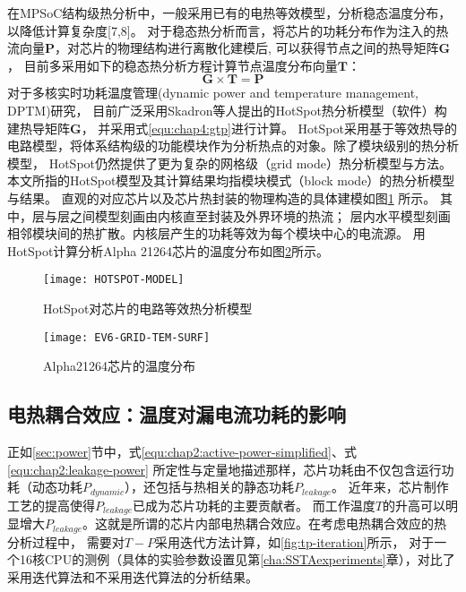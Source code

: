 在MPSoC结构级热分析中，一般采用已有的电热等效模型，分析稳态温度分布，以降低计算复杂度[7,8]。 对于稳态热分析而言，将芯片的功耗分布作为注入的热流向量$\mathbf{P}$，对芯片的物理结构进行离散化建模后, 可以获得节点之间的热导矩阵$\mathbf{G}$， 目前多采用如下的稳态热分析方程计算节点温度分布向量$\mathbf{T}$：
\begin{equation}
\label{equ:chap4:gtp}
\mathbf{G} \times \mathbf{T} = \mathbf{P}
\end{equation}
对于多核实时功耗温度管理(dynamic power and temperature management, DPTM)研究， 目前广泛采用Skadron等人提出的HotSpot热分析模型（软件）构建热导矩阵$\mathbf{G}$， 并采用式\ref{equ:chap4:gtp}进行计算。 HotSpot采用基于等效热导的电路模型，将体系结构级的功能模块作为分析热点的对象。除了模块级别的热分析模型， HotSpot仍然提供了更为复杂的网格级（grid mode）热分析模型与方法。本文所指的HotSpot模型及其计算结果均指模块模式（block mode）的热分析模型与结果。 直观的对应芯片以及芯片热封装的物理构造的具体建模如图\ref{fig:hotspot-model} 所示。
其中，层与层之间模型刻画由内核直至封装及外界环境的热流； 层内水平模型刻画相邻模块间的热扩散。内核层产生的功耗等效为每个模块中心的电流源。 用HotSpot计算分析Alpha 21264芯片的温度分布如图\ref{fig:ev6-grid-temp-surf}所示。

\begin{figure}[H]
  \centering
  \texttt{[image: HOTSPOT-MODEL]}
  \caption{HotSpot对芯片的电路等效热分析模型}
  \label{fig:hotspot-model}
\end{figure}

\begin{figure}[H]
  \centering
  \texttt{[image: EV6-GRID-TEM-SURF]}
  \caption{Alpha21264芯片的温度分布}
  \label{fig:ev6-grid-temp-surf}
\end{figure}


\subsection{电热耦合效应：温度对漏电流功耗的影响}
正如\ref{sec:power}节中，式\ref{equ:chap2:active-power-simplified}、式\ref{equ:chap2:leakage-power} 所定性与定量地描述那样，芯片功耗由不仅包含运行功耗（动态功耗$P_{dynamic}$），还包括与热相关的静态功耗$P_{leakage}$。 近年来，芯片制作工艺的提高使得$P_{leakage}$已成为芯片功耗的主要贡献者。 而工作温度$T$的升高可以明显增大$P_{leakage}$。这就是所谓的芯片内部电热耦合效应。在考虑电热耦合效应的热分析过程中， 需要对$T-P$采用迭代方法计算，如\ref{fig:tp-iteration}所示， 对于一个16核CPU的测例（具体的实验参数设置见第\ref{cha:SSTAexperiments}章），对比了采用迭代算法和不采用迭代算法的分析结果。


